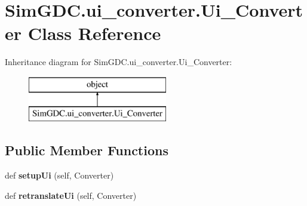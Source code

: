 \hypertarget{class_sim_g_d_c_1_1ui__converter_1_1_ui___converter}{}\section{Sim\+G\+D\+C.\+ui\+\_\+converter.\+Ui\+\_\+\+Converter Class Reference}
\label{class_sim_g_d_c_1_1ui__converter_1_1_ui___converter}
Inheritance diagram for Sim\+G\+D\+C.\+ui\+\_\+converter.\+Ui\+\_\+\+Converter\+:\begin{figure}[H]
\begin{center}
\leavevmode
\includegraphics[height=2.000000cm]{class_sim_g_d_c_1_1ui__converter_1_1_ui___converter}
\end{center}
\end{figure}
\subsection*{Public Member Functions}
\begin{DoxyCompactItemize}
\item 
\hypertarget{class_sim_g_d_c_1_1ui__converter_1_1_ui___converter_a0a1266647491792c2b5f175f5c7c9bbe}{}def {\bfseries setup\+Ui} (self, Converter)\label{class_sim_g_d_c_1_1ui__converter_1_1_ui___converter_a0a1266647491792c2b5f175f5c7c9bbe}

\item 
\hypertarget{class_sim_g_d_c_1_1ui__converter_1_1_ui___converter_ae023a354ab1af676c91eba5bb6c32ba6}{}def {\bfseries retranslate\+Ui} (self, Converter)\label{class_sim_g_d_c_1_1ui__converter_1_1_ui___converter_ae023a354ab1af676c91eba5bb6c32ba6}

\end{DoxyCompactItemize}
